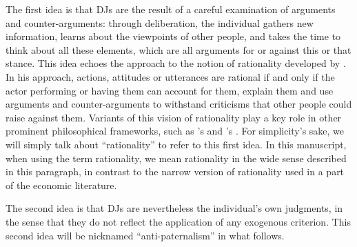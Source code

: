 \documentclass[version=3.21, pagesize, twoside=off, bibliography=totoc, DIV=calc, fontsize=12pt, a4paper, french, english]{scrartcl}
\begin{document}
{The first idea is that \acp{DJ} are the result of a careful examination of arguments and counter-arguments: through deliberation, the individual gathers new information, learns about the viewpoints of other people, and takes the time to think about all these elements, 
which are all arguments for or against this or that stance. 
This idea echoes the approach to the notion of rationality developed by \citet{habermas_theorie_1981}.
In his approach, actions, attitudes or utterances are rational if and only if the actor performing or having them can account for them, explain them and use arguments and counter-arguments to withstand criticisms that other people could raise against them. 
Variants of this vision of rationality play a key role in other prominent philosophical frameworks, such as \citeauthor{scanlon_what_2000}’s \citeyearpar{scanlon_what_2000} and \citeauthor{sen_idea_2009}’s \citeyearpar{sen_idea_2009}. 
For simplicity's sake, we will simply talk about ``rationality'' to refer to this first idea.%
In this manuscript, when using the term rationality, we mean rationality in the wide sense described in this paragraph, in contrast to the narrow version of rationality used in a part of the economic literature.

The second idea is that \acp{DJ} are nevertheless the individual's own judgments, in the sense that they do not reflect the application of any exogenous criterion. 
This second idea will be nicknamed ``anti-paternalism'' in what follows.

}
\end{document}

